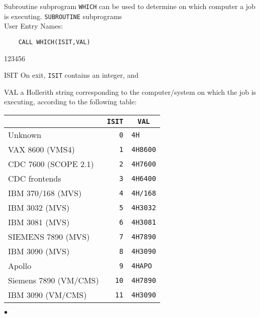                      
                    
                 
Subroutine subprogram {\tt WHICH} can be used to determine on which
computer a job is executing.
\Structure
{\tt SUBROUTINE} subprograms \\
User Entry Names: 
\Usage
\begin{verbatim}
    CALL WHICH(ISIT,VAL)
\end{verbatim}
\begin{DLtt}{123456}
\item[ISIT] On exit, {\tt ISIT} contains an integer, and
\item[VAL] a Hollerith string corresponding to the computer/system on
which the job is executing, according to the following table:
\end{DLtt}
\begin{center}
\begin{tabular}{|l|r|l|}
\cline{2-3}
\multicolumn{1}{c|}{}       &  {\tt ISIT} &
\multicolumn{1}{c|}{\tt VAL} \\ \hline
    Unknown                &  {\tt 0}  & {\tt 4H}     \\
    VAX 8600 (VMS4)        &  {\tt 1}  & {\tt 4H8600} \\
    CDC 7600 (SCOPE 2.1)   &  {\tt 2}  & {\tt 4H7600} \\
    CDC frontends          &  {\tt 3}  & {\tt 4H6400} \\
    IBM 370/168 (MVS)      &  {\tt 4}  & {\tt 4H/168} \\
    IBM 3032 (MVS)         &  {\tt 5}  & {\tt 4H3032} \\
    IBM 3081 (MVS)         &  {\tt 6}  & {\tt 4H3081} \\
    SIEMENS 7890 (MVS)     &  {\tt 7}  & {\tt 4H7890} \\
    IBM 3090 (MVS)         &  {\tt 8}  & {\tt 4H3090} \\
    Apollo                 &  {\tt 9}  & {\tt 4HAPO}  \\
    Siemens 7890 (VM/CMS)  &  {\tt 10} & {\tt 4H7890} \\
    IBM 3090 (VM/CMS)      &  {\tt 11} & {\tt 4H3090} \\ \hline
\end{tabular}
\end{center}
$\bullet$
